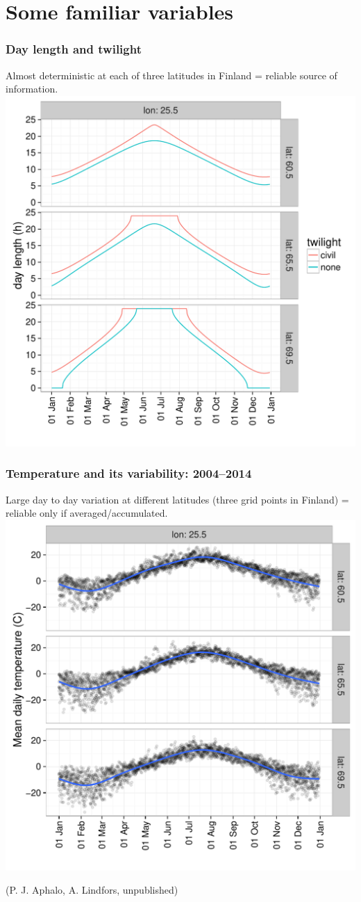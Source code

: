 \documentclass[10pt]{beamer}\usepackage[]{graphicx}\usepackage[]{xcolor}
\begin{document}
\section{Some familiar variables}

\begin{frame}
  \frametitle{Day length and twilight}
  Almost deterministic at each of three latitudes in Finland = reliable source of information.\\[0.5ex]
  \centering
  \includegraphics[width=0.6\linewidth]{figures/fig-anders4.pdf}
\end{frame}

\begin{frame}
  \frametitle{Temperature and its variability: 2004--2014}
  Large day to day variation at different latitudes (three grid points in Finland) = reliable only if averaged/accumulated.\\
  \centering
  \includegraphics[width=0.6\linewidth]{figures/fig-anders2.pdf}

  (P. J. Aphalo, A. Lindfors, unpublished)
\end{frame}
\end{document}
